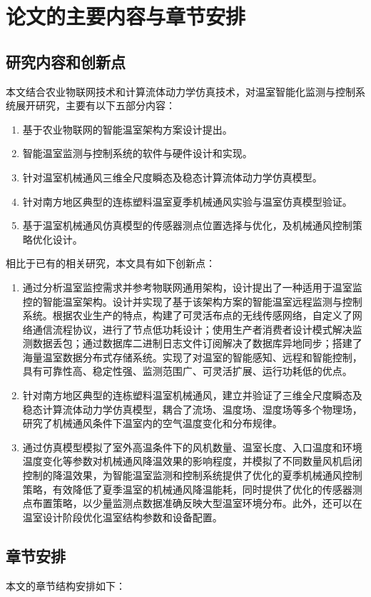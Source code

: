\section{论文的主要内容与章节安排}
	\subsection{研究内容和创新点}
本文结合农业物联网技术和计算流体动力学仿真技术，对温室智能化监测与控制系统展开研究，主要有以下五部分内容：
		\begin{enumerate}
			\item 基于农业物联网的智能温室架构方案设计提出。
			\item 智能温室监测与控制系统的软件与硬件设计和实现。
			\item 针对温室机械通风三维全尺度瞬态及稳态计算流体动力学仿真模型。
			\item 针对南方地区典型的连栋塑料温室夏季机械通风实验与温室仿真模型验证。
			\item 基于温室机械通风仿真模型的传感器测点位置选择与优化，及机械通风控制策略优化设计。
		\end{enumerate}
		
相比于已有的相关研究，本文具有如下创新点：
		\begin{enumerate}
			\item 通过分析温室监控需求并参考物联网通用架构，设计提出了一种适用于温室监控的智能温室架构。设计并实现了基于该架构方案的智能温室远程监测与控制系统。根据农业生产的特点，构建了可灵活布点的无线传感网络，自定义了网络通信流程协议，进行了节点低功耗设计；使用生产者消费者设计模式解决监测数据丢包；通过数据库二进制日志文件订阅解决了数据库异地同步；搭建了海量温室数据分布式存储系统。实现了对温室的智能感知、远程和智能控制，具有可靠性高、稳定性强、监测范围广、可灵活扩展、运行功耗低的优点。
			\item 针对南方地区典型的连栋塑料温室机械通风，建立并验证了三维全尺度瞬态及稳态计算流体动力学仿真模型，耦合了流场、温度场、湿度场等多个物理场，研究了机械通风条件下温室内的空气温度变化和分布规律。
			\item 通过仿真模型模拟了室外高温条件下的风机数量、温室长度、入口温度和环境温度变化等参数对机械通风降温效果的影响程度，并模拟了不同数量风机启闭控制的降温效果，为智能温室监测和控制系统提供了优化的夏季机械通风控制策略，有效降低了夏季温室的机械通风降温能耗，同时提供了优化的传感器测点布置策略，以少量监测点数据准确反映大型温室环境分布。此外，还可以在温室设计阶段优化温室结构参数和设备配置。
		\end{enumerate}	
	\subsection{章节安排}
	本文的章节结构安排如下：
	

